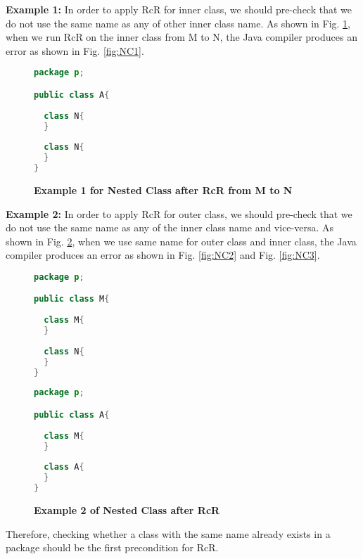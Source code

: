 \textbf{Example 1:} In order to apply RcR for inner class, we should pre-check that we do not use the same name as any of other inner class name. As shown in Fig. \ref{fig:nestedclass1}, when we run RcR on the inner class from M to N, the Java compiler produces an error as shown in Fig. \ref{fig:NC1}.

\begin{figure}[th]
\centering
\begin{minipage}[t]{0.5\linewidth}
\begin{lstlisting}[language=java, basicstyle=\scriptsize\ttfamily,frame=single]
package p;

public class A{	
    
  class N{
  }
    
  class N{
  }
} 
\end{lstlisting}
\end{minipage}
\caption{\textbf{Example 1 for Nested Class after RcR from M to N}}
\label{fig:nestedclass1}
\end{figure}

\textbf{Example 2:} In order to apply RcR for outer class, we should pre-check that we do not use the same name as any of the inner class name and vice-versa. As shown in Fig. \ref{fig:nestedclass2}, when we use same name for outer class and inner class, the Java compiler produces an error as shown in Fig. \ref{fig:NC2} and Fig. \ref{fig:NC3}.

\begin{figure}[th]
\centering
\begin{minipage}[t]{0.45\linewidth}
\begin{lstlisting}[language=java, basicstyle=\scriptsize\ttfamily,frame=single]
package p;

public class M{	
  
  class M{
  }
	
  class N{
  }
} 
\end{lstlisting}
\end{minipage}
\hfill
\begin{minipage}[t]{0.45\linewidth}
\begin{lstlisting}[language=java, basicstyle=\scriptsize\ttfamily,frame=single]
package p;

public class A{	
    
  class M{
  }
    
  class A{
  }
} 
\end{lstlisting}
\end{minipage}
\caption{\textbf{Example 2 of Nested Class after RcR}}
\label{fig:nestedclass2}
\end{figure}

Therefore, checking whether a class with the same name already exists in a package should be the first precondition for RcR. 
   
